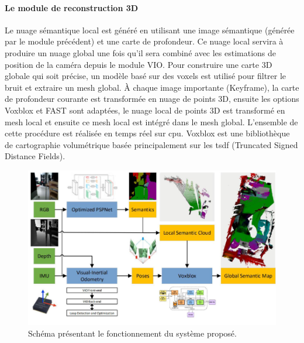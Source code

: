 \documentclass[11pt]{article}
\begin{document}
          \paragraph{Le module de reconstruction 3D}
            Le nuage sémantique local est généré en utilisant une image sémantique (générée par le module précédent) et une carte de profondeur. 
            Ce nuage local servira à produire un nuage global une fois qu'il sera combiné avec les estimations de position de la caméra depuis le module VIO.
            Pour construire une carte 3D globale qui soit précise, un modèle basé sur des voxels est utilisé pour filtrer le bruit et extraire un mesh global.
            À chaque image importante (Keyframe), la carte de profondeur courante est transformée en nuage de points 3D, ensuite les options Voxblox et FAST
            sont adaptées, le nuage local de points 3D est transformé en mesh local et ensuite ce mesh local est intégré dans le mesh global. L'ensemble de 
            cette procédure est réalisée en temps réel sur \acrshort{cpu}. Voxblox est une bibliothèque de cartographie volumétrique basée principalement 
            sur les \acrshort{tsdf} (Truncated Signed Distance Fields).

            \begin{figure}[hbt]  
              \includegraphics[width=\textwidth]{PipelineP2.png}    
              \caption{Schéma présentant le fonctionnement du système proposé.}
              \label{fig:PipelineP2}
            \end{figure} 
          
        \pagebreak  
\end{document}
